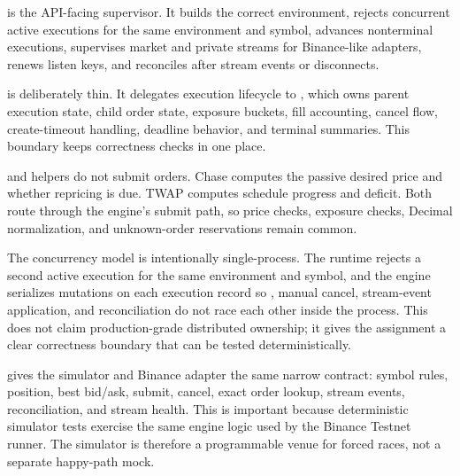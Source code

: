 is the API-facing supervisor. It builds the correct environment, rejects concurrent active executions for the same environment and symbol, advances nonterminal executions, supervises market and private streams for Binance-like adapters, renews listen keys, and reconciles after stream events or disconnects.

 is deliberately thin. It delegates execution lifecycle to , which owns parent execution state, child order state, exposure buckets, fill accounting, cancel flow, create-timeout handling, deadline behavior, and terminal summaries. This boundary keeps correctness checks in one place.

 and  helpers do not submit orders. Chase computes the passive desired price and whether repricing is due. TWAP computes schedule progress and deficit. Both route through the engine's submit path, so price checks, exposure checks, Decimal normalization, and unknown-order reservations remain common.

The concurrency model is intentionally single-process. The runtime rejects a second active execution for the same environment and symbol, and the engine serializes mutations on each execution record so , manual cancel, stream-event application, and reconciliation do not race each other inside the process. This does not claim production-grade distributed ownership; it gives the assignment a clear correctness boundary that can be tested deterministically.

 gives the simulator and Binance adapter the same narrow contract: symbol rules, position, best bid/ask, submit, cancel, exact order lookup, stream events, reconciliation, and stream health. This is important because deterministic simulator tests exercise the same engine logic used by the Binance Testnet runner. The simulator is therefore a programmable venue for forced races, not a separate happy-path mock.
